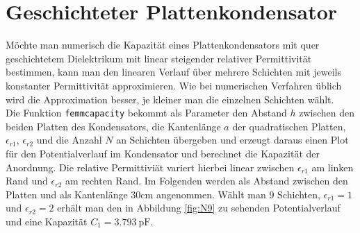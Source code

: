 \section{Geschichteter Plattenkondensator}

Möchte man numerisch die Kapazität eines Plattenkondensators mit quer geschichtetem Dielektrikum mit linear steigender relativer Permittivität bestimmen, kann man den linearen Verlauf über mehrere Schichten mit jeweils konstanter Permittivität approximieren. Wie bei numerischen Verfahren üblich wird die Approximation besser, je kleiner man die einzelnen Schichten wählt.\\
Die Funktion \texttt{femmcapacity} bekommt als Parameter den Abstand $h$ zwischen den beiden Platten des Kondensators, die Kantenlänge $a$ der quadratischen Platten, $\epsilon_{r1}$, $\epsilon_{r2}$ und die Anzahl $N$ an Schichten übergeben und erzeugt daraus einen Plot für den Potentialverlauf im Kondensator und berechnet die Kapazität der Anordnung. Die relative Permittiviät variert hierbei linear zwischen $\epsilon_{r1} $ am linken Rand und $\epsilon_{r2}$ am rechten Rand. Im Folgenden werden als Abstand zwischen den Platten und als Kantenlänge 30cm angenommen. Wählt man 9 Schichten, $\epsilon_{r1} = 1$ und $\epsilon_{r2} = 2$  erhält man den in Abbildung \ref{fig:N9} zu sehenden Potentialverlauf und eine Kapazität $ C_1 = \SI{3,793}{\pico\farad}$.

